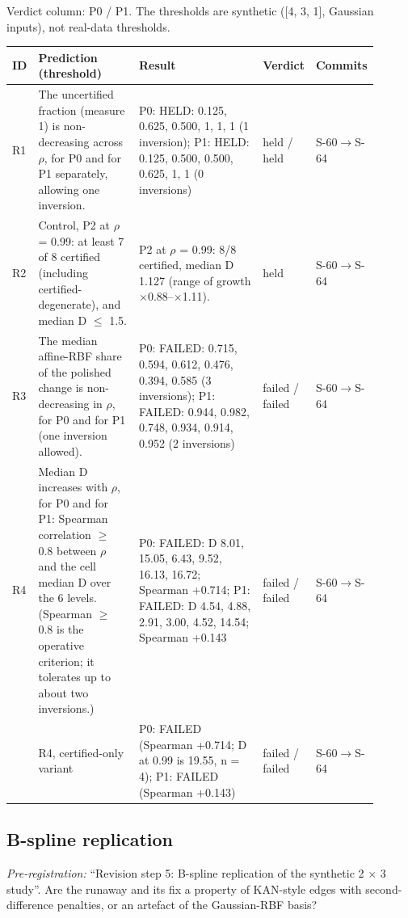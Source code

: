 Verdict column: P0 / P1. The thresholds are synthetic ([4, 3, 1], Gaussian inputs), not real-data thresholds.

{\footnotesize\setlength{\tabcolsep}{3pt}
\begin{longtable}{R{0.07\linewidth} R{0.28\linewidth} R{0.35\linewidth} R{0.09\linewidth} R{0.11\linewidth}}
\toprule
ID & Prediction (threshold) & Result & Verdict & Commits \\
\midrule
\endhead
R1 & The uncertified fraction (measure 1) is non-decreasing across $\rho$, for P0 and for P1 separately, allowing one inversion. & P0: HELD: 0.125, 0.625, 0.500, 1, 1, 1 (1 inversion); P1: HELD: 0.125, 0.500, 0.500, 0.625, 1, 1 (0 inversions) & held / held & S-60$\to$\allowbreak S-64 \\
R2 & Control, P2 at $\rho$ = 0.99: at least 7 of 8 certified (including certified-degenerate), and median D $\leq$ 1.5. & P2 at $\rho$ = 0.99: 8/8 certified, median D 1.127 (range of growth $\times$0.88--$\times$1.11). & held & S-60$\to$\allowbreak S-64 \\
R3 & The median affine-RBF share of the polished change is non-decreasing in $\rho$, for P0 and for P1 (one inversion allowed). & P0: FAILED: 0.715, 0.594, 0.612, 0.476, 0.394, 0.585 (3 inversions); P1: FAILED: 0.944, 0.982, 0.748, 0.934, 0.914, 0.952 (2 inversions) & failed / failed & S-60$\to$\allowbreak S-64 \\
R4 & Median D increases with $\rho$, for P0 and for P1: Spearman correlation $\geq$ 0.8 between $\rho$ and the cell median D over the 6 levels. (Spearman $\geq$ 0.8 is the operative criterion; it tolerates up to about two inversions.) & P0: FAILED: D 8.01, 15.05, 6.43, 9.52, 16.13, 16.72; Spearman +0.714; P1: FAILED: D 4.54, 4.88, 2.91, 3.00, 4.52, 14.54; Spearman +0.143 & failed / failed & S-60$\to$\allowbreak S-64 \\
 & R4, certified-only variant & P0: FAILED (Spearman +0.714; D at 0.99 is 19.55, n = 4); P1: FAILED (Spearman +0.143) & failed / failed & S-60$\to$\allowbreak S-64 \\
\bottomrule
\end{longtable}}
\subsection{B-spline replication}
\noindent\textit{Pre-registration:} ``Revision step 5: B-spline replication of the synthetic 2 $\times$ 3 study''. Are the runaway and its fix a property of KAN-style edges with second-difference penalties, or an artefact of the Gaussian-RBF basis?

